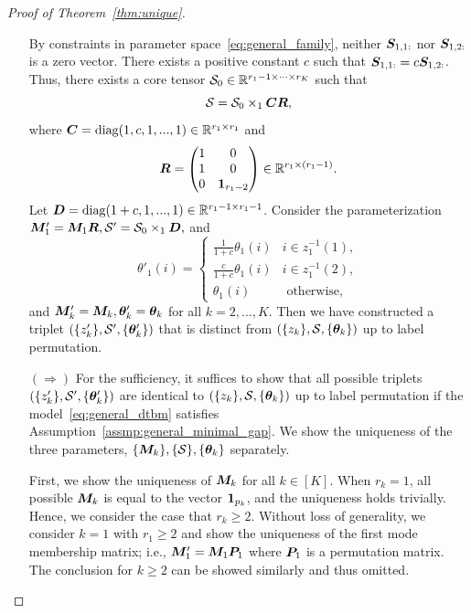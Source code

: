 \documentclass[journal]{IEEEtran}
\theoremstyle{definition}
\theoremstyle{definition}
\newcommand{\of}[1]{\left(#1\right)}
\begin{document}
\begin{proof}[Proof of Theorem~\ref{thm:unique}]
\begin{enumerate}[wide]
{By constraints in parameter space~\eqref{eq:general_family}, neither $\bm S_{1,1:}$ nor $\bm S_{1,2:}$ is a zero vector.
}
There exists a positive constant $c$ such that $\bm S_{1,1:} = c \bm S_{1,2:}$. Thus, there exists a core tensor $\mathcal{S}_0 \in \mathbb{R}^{r_1 -1 \times \cdots \times r_K}$ such that 
\begin{equation}
    \mathcal{S} = \mathcal{S}_0 \times_1 \bm C \bm{R},
\end{equation}
where $\bm C = \text{diag}(1, c, 1,...,1) \in \mathbb{R}^{r_1 \times r_1}$ and 
\begin{equation}
    \bm{R} = \begin{pmatrix}
    1& 0\\
    1&0 \\
    0 & \mathbf{1}_{r_1-2}
    \end{pmatrix} \in \mathbb{R}^{r_1 \times (r_1 -1)}.
\end{equation}
Let $\bm{D} = \text{diag}(1+c, 1,...,1) \in \mathbb{R}^{r_1 -1 \times r_1 -1}$. Consider the parameterization $\bm M'_1 = \bm M_1 \bm{R},\mathcal{S}' = \mathcal{S}_0 \times_1 \bm{D},$ and 
\begin{equation}
     \theta'_{1}(i) = \begin{cases}
    \frac{1}{1+c} \theta_{1}(i) & i \in z_{1}^{-1}(1),\\
     \frac{c}{1+c} \theta_{1}(i) & i \in z_{1}^{-1}(2),\\
     \theta_{1}(i) & \text{ otherwise},
    \end{cases}
\end{equation}
and $\bm M'_k = \bm M_k, \boldsymbol{\theta}'_k = \boldsymbol{\theta}_k$ for all $k = 2, \ldots, K$. Then we have constructed a
triplet $\of{ \{z'_k\}, \tS', \{ \mtheta'_k \} }$ that is distinct from $\of{ \{z_k\}, \tS, \{ \mtheta_k \} }$ up to label permutation. 

\item[$(\Rightarrow)$] For the sufficiency, it suffices to show that all possible triplets $\of{ \{z'_k\}, \tS', \{ \mtheta'_k \} }$ are identical to $\of{ \{z_k\}, \tS, \{ \mtheta_k \} }$ up to label permutation if the model~\eqref{eq:general_dtbm} satisfies Assumption~\eqref{assmp:general_minimal_gap}. We show the uniqueness of the three parameters, $\{\bm M_k\}, \{\mathcal{S}\}, \{\boldsymbol{\theta}_k\}$ separately.

First, we show the uniqueness of $\bm M_k$ for all $k \in [K]$. 
{When $r_k = 1$, all possible $\bm M_k$ is equal to the vector ${\bf 1}_{p_k}$, and the uniqueness holds trivially. Hence, we consider the case that $r_k \geq 2$. Without loss of generality, we consider $k=1$ with $r_1 \geq 2$ and show the uniqueness of the first mode membership matrix;}  
i.e., $\bm M'_1 = \bm M_1\bm{P}_1$ where $\bm{P}_1$ is a permutation matrix. The conclusion for $k\geq 2$ can be showed similarly and thus omitted. 


\end{enumerate}
\end{proof}
\end{document}
